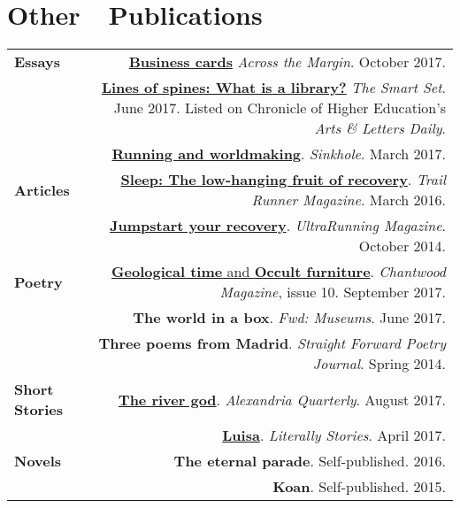 \documentclass[letterpaper,11pt]{article}
\begin{document}
\section*{Other~~Publications}
\begin{longtable}{ @{} L @{} R @{} }
	
\textbf{Essays}	& \href{http://acrossthemargin.com/business-cards/}{\textbf{Business cards}} \emph{Across the Margin}. October 2017. \\
\quad & \href{http://thesmartset.com/lines-of-spines/}{\textbf{Lines of spines: What is a library?}} \emph{The Smart Set}. June 2017. Listed on Chronicle of Higher Education’s \emph{Arts \& Letters Daily}.\\
\quad & \href{http://sinkholemag.com/tim-gorichanaz-3-1-17}{\textbf{Running and worldmaking}}. \emph{Sinkhole}. March 2017.\\[1em]

\textbf{Articles} & \href{http://trailrunnermag.com/training/injuries-and-treatment/sleep-the-low-hanging-fruit-of-recovery.html}{\textbf{Sleep: The low-hanging fruit of recovery}}. \emph{Trail Runner Magazine}. March 2016.\\
\quad & \href{http://ultrarunning.com/featured/jumpstart-your-recovery/}{\textbf{Jumpstart your recovery}}. \emph{UltraRunning Magazine}. October 2014.\\[1em]

\textbf{Poetry} & \href{http://amzn.to/2yJNWvV}{\textbf{Geological time} and \textbf{Occult furniture}}. \emph{Chantwood Magazine}, issue 10. September 2017.\\
\quad & \textbf{The world in a box}. \emph{Fwd: Museums}. June 2017.\\
& \textbf{Three poems from Madrid}. \emph{Straight Forward Poetry Journal}. Spring 2014.\\[1em]

\textbf{Short Stories}& \href{http://www.alexandriaquarterlymag.com/fiction-tim-gorichanaz/}{\textbf{The river god}}. \emph{Alexandria Quarterly}. August 2017.\\
\quad & \href{http://literallystories2014.com/2017/04/18/luisa-by-tim-gorichanaz/}{\textbf{Luisa}}. \emph{Literally Stories}. April 2017.\\[1em]

\textbf{Novels}	&\textbf{The eternal parade}. Self-published. 2016.\\
\quad &\textbf{Koan}. Self-published. 2015.

\end{longtable}
\end{document}
